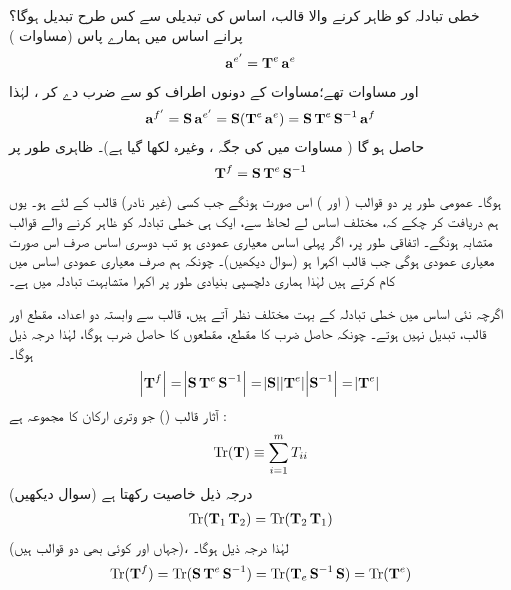 خطی تبادلہ  کو ظاہر کرنے والا قالب،  اساس کی تبدیلی سے کس طرح تبدیل ہوگا؟ پرانے اساس میں ہمارے پاس   (مساوات )
\begin{align*}
	\operatorname{\mathbf{a}}^{e'} = \operatorname{\mathbf{T}}^e\operatorname{\mathbf{a}}^e
\end{align*}
اور مساوات   تھے؛مساوات    کے   دونوں اطراف کو  سے ضرب دے کر     ،  لہٰذا   
\begin{align*}
	\operatorname{\mathbf{a}}^{f'} = \operatorname{\mathbf{S}}\operatorname{\mathbf{a}}^{e'} = \operatorname{\mathbf{S}}(\operatorname{\mathbf{T}}^e\operatorname{\mathbf{a}}^e) = \operatorname{\mathbf{S}}\operatorname{\mathbf{T}}^e\operatorname{\mathbf{S}}^{-1}\operatorname{\mathbf{a}}^f
\end{align*}
حاصل  ہو گا ( مساوات   میں  کی جگہ ، وغیرہ لکھا گیا ہے)۔ ظاہری طور پر
\begin{align}\label{مساوات_ضمیمہ_دوسرا_اساس}
	\operatorname{\mathbf{T}}^f = \operatorname{\mathbf{S}}\operatorname{\mathbf{T}}^e\operatorname{\mathbf{S}}^{-1}
\end{align}
ہوگا۔ عمومی طور پر دو قوالب (  اور ) اس صورت    ہونگے جب کسی (غیر نادر)  قالب  کے لئے   ہو۔ یوں ہم دریافت کر چکے کہ،  مختلف اساس لے لحاظ سے،  ایک ہی خطی تبادلہ کو ظاہر کرنے والے قوالب متشابہ ہونگے۔ اتفاقی طور پر،  اگر پہلی اساس معیاری عمودی ہو تب دوسری اساس صرف اس صورت  معیاری عمودی ہوگی  جب قالب  اکہرا ہو  (سوال  دیکھیں)۔ چونکہ ہم صرف معیاری عمودی اساس میں کام کرتے ہیں لہٰذا ہماری دلچسپی بنیادی طور پر  اکہرا  متشابہت  تبادلہ میں ہے۔

اگرچہ نئی اساس میں  خطی تبادلہ کے   بہت مختلف نظر آتے ہیں،  قالب سے وابستہ دو اعداد،  مقطع اور    قالب،  تبدیل نہیں ہوتے۔ چونکہ حاصل ضرب کا مقطع،  مقطعوں  کا حاصل ضرب ہوگا،  لہٰذا درجہ ذیل ہوگا۔
\begin{align}\label{مساوات_ضمیمہ_حاصل_ضرب}
	\abs{\operatorname{\mathbf{T}}^f} = \abs{\operatorname{\mathbf{S}}\operatorname{\mathbf{T}}^e\operatorname{\mathbf{S}}^{-1}} = \abs{\operatorname{\mathbf{S}}}\abs{\operatorname{\mathbf{T}}^e}\abs{\operatorname{\mathbf{S}}^{-1}} = \abs{\operatorname{\mathbf{T}}^e}
\end{align}
 آثار قالب  () جو وتری ارکان کا مجموعہ ہے :
\begin{align}
	\operatorname{Tr}(\operatorname{\mathbf{T}})\equiv\sum_{i=1}^{m}T_{ii}
\end{align}
درجہ ذیل خاصیت رکھتا ہے  (سوال   دیکھیں)
\begin{align}
	\operatorname{Tr}(\operatorname{\mathbf{T}}_1\operatorname{\mathbf{T}}_2) = \operatorname{Tr}(\operatorname{\mathbf{T}}_2\operatorname{\mathbf{T}}_1)
\end{align}
 (جہاں  اور  کوئی بھی دو قوالب ہیں)،   لہٰذا درجہ ذیل ہوگا۔
\begin{align}\label{مساوات_ضمیمہ_آثار}
	\operatorname{Tr}(\operatorname{\mathbf{T}}^f) = \operatorname{Tr}(\operatorname{\mathbf{S}}\operatorname{\mathbf{T}}^e\operatorname{\mathbf{S}}^{-1}) = \operatorname{Tr}(\operatorname{\mathbf{T}}_e\operatorname{\mathbf{S}}^{-1}\operatorname{\mathbf{S}}) = \operatorname{Tr}(\operatorname{\mathbf{T}}^e)
\end{align}


